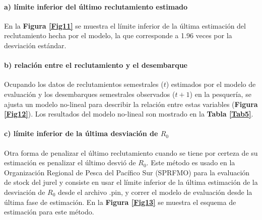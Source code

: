 \documentclass[letter,11pt]{article}
\begin{document}
\paragraph{a) l\'imite inferior del \'ultimo reclutamiento estimado}

\quad

En la \textbf{Figura \ref{Fig11}} se muestra el l\'imite inferior de la 
\'ultima estimaci\'on del reclutamiento hecha por el modelo, la que 
corresponde a 1.96 veces por la desviaci\'on est\'andar.


\paragraph{b) relaci\'on entre el reclutamiento y el desembarque}

\quad

Ocupando los datos de reclutamientos semestrales ($t$) estimados por el 
modelo de evaluaci\'on y los desembarques semestrales observados ($t+1$) en
la pesquer\'ia, se ajusta un modelo no-lineal para describir la relaci\'on
entre estas variables (\textbf{Figura \ref{Fig12}}). Los resultados del
modelo no-lineal son mostrado en la \textbf{Tabla \ref{Tab5}}.


\paragraph{c) l\'imite inferior de la \'ultima desviaci\'on de $R_{0}$}

\quad

Otra forma de penalizar el \'ultimo reclutamiento cuando se tiene por certeza
de su estimaci\'on es penalizar el \'ultimo desvi\'o de $R_{0}$. Este m\'etodo
es usado en la Organizaci\'on Regional de Pesca del Pac\'ifico Sur (SPRFMO) para
la evaluaci\'on de stock del jurel y consiste en usar el l\'imite inferior de la
\'ultima estimaci\'on de la desviaci\'on de $R_{0}$ desde el archivo .pin, y correr
el modelo de evaluaci\'on desde la \'ultima fase de estimaci\'on. En la
\textbf{Figura \ref{Fig13}} se muestra el esquema de estimaci\'on para este m\'etodo.  
\end{document}
